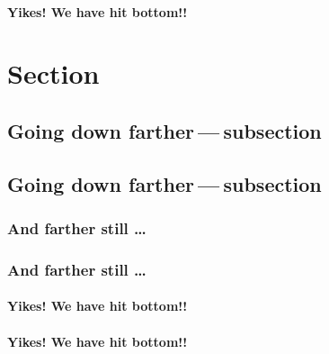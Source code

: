 \paragraph{Yikes! We have hit bottom!!}
\hypertarget{_yikes!_we_have_hit_bottom!!}{}
\section*{Section}
\hypertarget{_section}{\subsection*{Going down farther — subsection}}
\subsection*{Going down farther — subsection}
\hypertarget{_going_down_farther — subsection}{\subsubsection*{And farther still …​}}
\subsubsection*{And farther still …​}
\hypertarget{_and_farther_still_…​}{\paragraph*{Yikes! We have hit bottom!!}}
\paragraph*{Yikes! We have hit bottom!!}
\hypertarget{_yikes!_we_have_hit_bottom!!}{}
